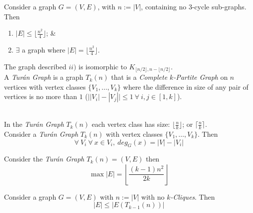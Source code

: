 \documentclass[11pt,a4paper]{article}
\begin{document}
Consider a graph $G=(V,E)$, with $n:=|V|$, containing no $3$-cycle sub-graphs. Then
\begin{enumerate}
	\item $|E|\leq\lfloor\frac{n^2}{4}\rfloor$; \&
	\item $\exists$ a graph where $|E|=\lfloor\frac{n^2}{4}\rfloor$.
\end{enumerate}
\NB The graph described $ii)$ is isomorphic to $K_{\lfloor n/2\rfloor,n-\lfloor n/2\rfloor}$.\\

A \textit{Tur\'an Graph} is a graph $T_k(n)$ that is a  \textit{Complete $k$-Partite Graph} on $n$ vertices with vertex classes $\{V_1,\dots,V_k\}$ where the difference in size of any pair of vertices is no more than $1$ (\ie $\big||V_i|-|V_j|\big|\leq1\ \forall\ i,j\in[1,k]$).\\

\\

In the \textit{Tur\'an Graph} $T_k(n)$ each vertex class has size: $\lfloor\frac{n}{k}\rfloor$; or $\lceil\frac{n}{k}\rceil$.\\

Consider a \textit{Tur\'an Graph} $T_k(n)$ with vertex classes $\{V_1,\dots,V_k\}$. Then
$$\forall\ V_i\ \forall\ x\in V_i,\ deg_G(x)=|V|-|V_i|$$

Consider the \textit{Tur\'an Graph} $T_k(n)=(V,E)$ then
$$\max|E|=\left\lfloor\frac{(k-1)n^2}{2k}\right\rfloor$$

Consider a graph $G=(V,E)$ with $n:=|V|$ with no \textit{$k$-Cliques}. Then
$$|E|\leq|E(T_{k-1}(n))|$$
\end{document}
